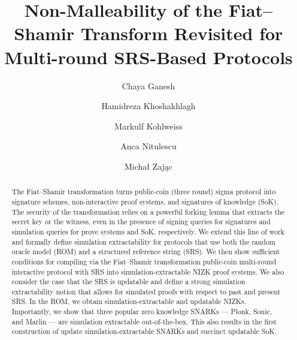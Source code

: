 \documentclass[runningheads,11pt]{llncs}
\title{Non-Malleability of the Fiat--Shamir Transform Revisited for Multi-round SRS-Based Protocols}
\author{Chaya Ganesh \and Hamidreza Khoshakhlagh \and Markulf
  Kohlweiss\inst{1,2} \and Anca Nitulescu \and Michał Zając\inst{3}}
\institute{University of Edinburgh, Edinburgh, UK \and IOHK \\
\email{mkohlwei@inf.ed.ac.uk} \and Clearmatics, London, UK \\
\email{m.p.zajac@gmail.com}}
\begin{document}
 \sloppy
{}
\maketitle

\begin{abstract}
The Fiat--Shamir transformation turns public-coin (three round) sigma protocol into signature schemes, non-interactive proof systems, and signatures of knowledge (SoK).  The security of the transformation relies on a powerful forking lemma that extracts the secret key or the witness, even in the presence of signing queries for signatures and simulation queries for prove systems and SoK, respectively.
We extend this line of work and formally define simulation extractability for protocols that use both the random oracle model (ROM) and a structured reference string (SRS). We then show sufficient conditions for compiling via the Fiat--Shamir transformation public-coin multi-round interactive protocol with SRS into simulation-extractable NIZK proof systems. We also consider the case that the SRS is updatable and define a strong simulation extractability notion that allows for simulated proofs with respect to past and present SRS.
In the ROM, we obtain simulation-extractable and updatable NIZKs. Importantly, we show that three popular zero knowledge SNARKs --- Plonk, Sonic, and Marlin --- are simulation extractable out-of-the-box. This also results in the first construction of update simulation-extractable SNARKs and succinct updatable SoK.

\end{abstract}
\end{document}
